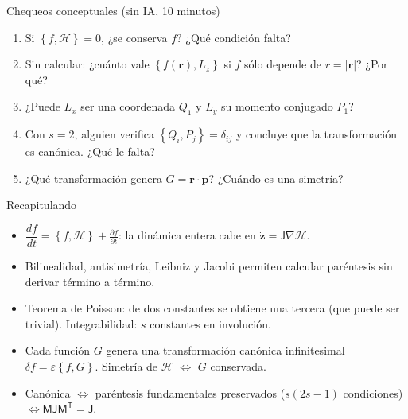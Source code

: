 \documentclass[spanish]{beamer}
\newcommand{\Ham}{\mathcal{H}}
\newcommand{\pd}[2]{\frac{\partial #1}{\partial #2}}
\newcommand{\pb}[2]{\left\{#1,#2\right\}}   %
\newcommand{\J}{\mathsf{J}}                  %
\begin{document}
\begin{frame}{Chequeos conceptuales (sin IA, 10 minutos)}
\begin{enumerate}
  \item<1-> Si $\pb{f}{\Ham}=0$, ¿se conserva $f$? ¿Qué condición falta?
  \item<2-> Sin calcular: ¿cuánto vale $\pb{f(\mathbf r)}{L_z}$ si $f$ sólo depende
        de $r=|\mathbf r|$? ¿Por qué?
  \item<3-> ¿Puede $L_x$ ser una coordenada $Q_1$ y $L_y$ su momento conjugado $P_1$?
  \item<4-> Con $s=2$, alguien verifica $\pb{Q_i}{P_j}=\delta_{ij}$ y concluye que la
        transformación es canónica. ¿Qué le falta?
  \item<5-> ¿Qué transformación genera $G = \mathbf r\cdot\mathbf p$? ¿Cuándo es una
        simetría?
\end{enumerate}
\end{frame}

\begin{frame}{Recapitulando}
\begin{itemize}
  \item<1-> $\dfrac{df}{dt} = \pb{f}{\Ham} + \pd{f}{t}$: la dinámica entera cabe en
        $\dot{\mathbf z} = \J\nabla\Ham$.
  \item<2-> Bilinealidad, antisimetría, Leibniz y Jacobi permiten calcular paréntesis
        sin derivar término a término.
  \item<3-> Teorema de Poisson: de dos constantes se obtiene una tercera (que puede
        ser trivial). Integrabilidad: $s$ constantes en involución.
  \item<4-> Cada función $G$ genera una transformación canónica infinitesimal
        $\delta f = \varepsilon\pb{f}{G}$. Simetría de $\Ham$ $\iff$ $G$ conservada.
  \item<5-> Canónica $\iff$ paréntesis fundamentales preservados
        ($s(2s-1)$ condiciones) $\iff \mathsf M\J\mathsf M^{\mathsf T} = \J$.
\end{itemize}
\vspace{0.2cm}
\end{frame}
\end{document}
